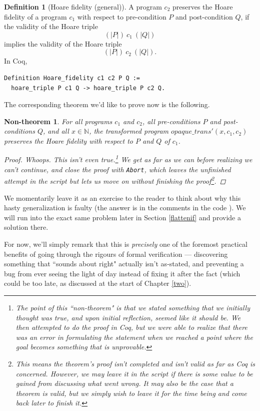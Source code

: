 \documentclass[12pt,notitlepage]{report}
\theoremstyle{plain}
\newtheorem{nontheo}[theo]{Non-theorem}
\theoremstyle{definition}
\newtheorem{defin}[theo]{Definition}
\newcommand\N{\mathbb{N}}
\numberwithin{equation}{section}
\begin{document}
\begin{defin}[Hoare fidelity (general)]
A program $c_2$ preserves the Hoare fidelity of a program $c_1$ with respect to pre-condition $P$ and post-condition $Q$, if the validity of the Hoare triple
\[
(| P |)\ c_1\ (| Q |)
\]
implies the validity of the Hoare triple
\[
(| P |)\ c_2\ (| Q |).
\]
In Coq,
\begin{verbatim}
Definition Hoare_fidelity c1 c2 P Q :=
  hoare_triple P c1 Q -> hoare_triple P c2 Q.
\end{verbatim}
\end{defin}

The corresponding theorem we'd like to prove now is the following.

\begin{nontheo}\label{hoarefail}
For all programs $c_1$ and $c_2$, all pre-conditions $P$ and post-conditions $Q$, and all $x \in \N$, the transformed program $opaque\_trans'(x, c_1, c_2)$ preserves the Hoare fidelity with respect to $P$ and $Q$ of $c_1$.
\begin{proof}
    Whoops.  This isn't even true.\footnote{The point of this ``non-theorem" is that we stated something that we initially thought was true, and upon initial reflection, seemed like it should be.  We then attempted to do the proof in Coq, but we were able to realize that there was an error in formulating the statement when we reached a point where the goal becomes something that is unprovable.}  We get as far as we can before realizing we can't continue, and close the proof with \verb$Abort$, which leaves the unfinished attempt in the script but lets us move on without finishing the proof\footnote{This means the theorem's proof isn't completed and isn't valid as far as Coq is concerned.  However, we may leave it in the script if there is some value to be gained from discussing what went wrong.  It may also be the case that a theorem \emph{is} valid, but we simply wish to leave it for the time being and come back later to finish it.}.
\end{proof}
\end{nontheo}

We momentarily leave it as an exercise to the reader to think about why this hasty generalization is faulty (the answer is in the comments in the code \cite{repo}).  We will run into the exact same problem later in Section \ref{flattenif} and provide a solution there.  
\par For now, we'll simply remark that this is \emph{precisely} one of the foremost practical benefits of going through the rigours of formal verification --- discovering something that ``sounds about right" actually isn't as-stated, and preventing a bug from ever seeing the light of day instead of fixing it after the fact (which could be too late, as discussed at the start of Chapter \ref{two}).
\end{document}
